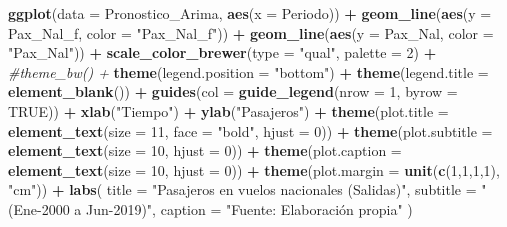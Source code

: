 \documentclass[
]{book}
\newenvironment{Shaded}{\begin{snugshade}}{\end{snugshade}}
\newcommand{\AttributeTok}[1]{\textcolor[rgb]{0.13,0.29,0.53}{#1}}
\newcommand{\CommentTok}[1]{\textcolor[rgb]{0.56,0.35,0.01}{\textit{#1}}}
\newcommand{\ConstantTok}[1]{\textcolor[rgb]{0.56,0.35,0.01}{#1}}
\newcommand{\DecValTok}[1]{\textcolor[rgb]{0.00,0.00,0.81}{#1}}
\newcommand{\FunctionTok}[1]{\textcolor[rgb]{0.13,0.29,0.53}{\textbf{#1}}}
\newcommand{\NormalTok}[1]{#1}
\newcommand{\SpecialCharTok}[1]{\textcolor[rgb]{0.81,0.36,0.00}{\textbf{#1}}}
\newcommand{\StringTok}[1]{\textcolor[rgb]{0.31,0.60,0.02}{#1}}
\begin{document}
\begin{Shaded}
\begin{Highlighting}[]
\FunctionTok{ggplot}\NormalTok{(}\AttributeTok{data =}\NormalTok{ Pronostico\_Arima, }\FunctionTok{aes}\NormalTok{(}\AttributeTok{x =}\NormalTok{ Periodo)) }\SpecialCharTok{+}
  \FunctionTok{geom\_line}\NormalTok{(}\FunctionTok{aes}\NormalTok{(}\AttributeTok{y =}\NormalTok{ Pax\_Nal\_f, }\AttributeTok{color =} \StringTok{"Pax\_Nal\_f"}\NormalTok{)) }\SpecialCharTok{+}
  \FunctionTok{geom\_line}\NormalTok{(}\FunctionTok{aes}\NormalTok{(}\AttributeTok{y =}\NormalTok{ Pax\_Nal, }\AttributeTok{color =} \StringTok{"Pax\_Nal"}\NormalTok{)) }\SpecialCharTok{+}
  \FunctionTok{scale\_color\_brewer}\NormalTok{(}\AttributeTok{type =} \StringTok{"qual"}\NormalTok{, }\AttributeTok{palette =} \DecValTok{2}\NormalTok{) }\SpecialCharTok{+}
  \CommentTok{\#theme\_bw() + }
  \FunctionTok{theme}\NormalTok{(}\AttributeTok{legend.position =} \StringTok{"bottom"}\NormalTok{) }\SpecialCharTok{+}
  \FunctionTok{theme}\NormalTok{(}\AttributeTok{legend.title =} \FunctionTok{element\_blank}\NormalTok{()) }\SpecialCharTok{+}
  \FunctionTok{guides}\NormalTok{(}\AttributeTok{col =} \FunctionTok{guide\_legend}\NormalTok{(}\AttributeTok{nrow =} \DecValTok{1}\NormalTok{, }\AttributeTok{byrow =} \ConstantTok{TRUE}\NormalTok{)) }\SpecialCharTok{+} 
  \FunctionTok{xlab}\NormalTok{(}\StringTok{"Tiempo"}\NormalTok{) }\SpecialCharTok{+} 
  \FunctionTok{ylab}\NormalTok{(}\StringTok{"Pasajeros"}\NormalTok{) }\SpecialCharTok{+} 
  \FunctionTok{theme}\NormalTok{(}\AttributeTok{plot.title =} \FunctionTok{element\_text}\NormalTok{(}\AttributeTok{size =} \DecValTok{11}\NormalTok{, }\AttributeTok{face =} \StringTok{"bold"}\NormalTok{, }
                                  \AttributeTok{hjust =} \DecValTok{0}\NormalTok{)) }\SpecialCharTok{+} 
  \FunctionTok{theme}\NormalTok{(}\AttributeTok{plot.subtitle =} \FunctionTok{element\_text}\NormalTok{(}\AttributeTok{size =} \DecValTok{10}\NormalTok{, }\AttributeTok{hjust =} \DecValTok{0}\NormalTok{)) }\SpecialCharTok{+} 
  \FunctionTok{theme}\NormalTok{(}\AttributeTok{plot.caption =} \FunctionTok{element\_text}\NormalTok{(}\AttributeTok{size =} \DecValTok{10}\NormalTok{, }\AttributeTok{hjust =} \DecValTok{0}\NormalTok{)) }\SpecialCharTok{+}
  \FunctionTok{theme}\NormalTok{(}\AttributeTok{plot.margin =} \FunctionTok{unit}\NormalTok{(}\FunctionTok{c}\NormalTok{(}\DecValTok{1}\NormalTok{,}\DecValTok{1}\NormalTok{,}\DecValTok{1}\NormalTok{,}\DecValTok{1}\NormalTok{), }\StringTok{"cm"}\NormalTok{)) }\SpecialCharTok{+}
  \FunctionTok{labs}\NormalTok{(}
    \AttributeTok{title =} \StringTok{"Pasajeros en vuelos nacionales (Salidas)"}\NormalTok{,}
    \AttributeTok{subtitle =} \StringTok{"(Ene{-}2000 a Jun{-}2019)"}\NormalTok{,}
    \AttributeTok{caption =} \StringTok{"Fuente: Elaboración propia"}
\NormalTok{  )}
\end{Highlighting}
\end{Shaded}
\end{document}
